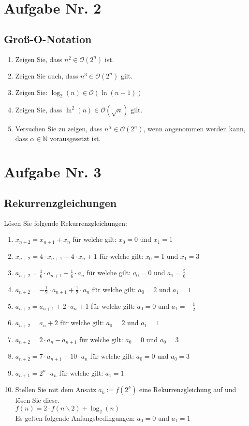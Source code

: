 \documentclass[12px,a4paper]{article}
\begin{document}
\newpage
\section*{Aufgabe Nr. 2}
\subsection*{Groß-O-Notation}
\begin{enumerate}
	\item Zeigen Sie, dass $n^2 \in \mathcal{O}(2^n)$ ist.
	\item Zeigen Sie auch, dass $n^3 \in \mathcal{O}(2^n)$ gilt.
	\item Zeigen Sie: $ \log_2(n) \in \mathcal{O}(\ln(n+1)) $
	
	\item Zeigen Sie, dass $\ln^2 (n) \in \mathcal{O}(\sqrt{n})$ gilt.
	\item Versuchen Sie zu zeigen, dass $n^{\alpha} \in \mathcal{O}(2^n)$, wenn angenommen werden kann, dass $\alpha \in \mathbb{N}$ vorausgesetzt ist.
\end{enumerate}
\newpage
\section*{Aufgabe Nr. 3}
\subsection*{Rekurrenzgleichungen}
Lösen Sie folgende Rekurrenzgleichungen: \\
\begin{enumerate}
	\item $x_{n+2}=x_{n+1} + x_n$ für welche gilt:	$x_0 = 0$ und $x_1 =1$
	\item $x_{n+2}=4 \cdot x_{n+1} - 4 \cdot x_n +1$ für welche gilt:	$x_0=1$ und $x_1=3$
	\item $a_{n+2} = \frac{1}{6} \cdot a_{n+1} + \frac{1}{6} \cdot a_n$ für welche gilt:	$a_0 = 0$ und $a_1 = \frac{5}{6}$
	\item $a_{n+2} = -\frac{1}{2} \cdot a_{n+1} + \frac{1}{2} \cdot a_n$ für welche gilt: $a_0 = 2$ und $a_1 = 1$
	\item $a_{n+2} = a_{n+1} + 2 \cdot a_n +1$ für welche gilt:	$a_0 = 0$ und $a_1 = - \frac{1}{2}$
	\item $a_{n+2} = a_n +2$ für welche gilt:	$a_0 = 2$ und $a_1 = 1$
	\item $a_{n+2} = 2 \cdot a_n - a_{n+1}$ für welche gilt:	$a_0 = 0$ und $a_0 = 3$
	\item $a_{n+2} = 7 \cdot a_{n+1} - 10 \cdot a_n$ für welche gilt:	$a_0 = 0$ und $a_0 = 3$
	\item $a_{n+1} = 2^n \cdot a_n$ für welche gilt: $a_1 = 1$
	\item Stellen Sie mit dem Ansatz $a_k := f(2^k)$ eine Rekurrenzgleichung auf und lösen Sie diese.\\ 
			\noindent\hspace*{5mm} $f(n) = 2 \cdot f(n\backslash 2) + \log_2(n)$ \\
			Es gelten folgende Anfangsbedingungen:	$a_0 = 0$ und $a_1 = 1$
\end{enumerate}
\newpage
\end{document}
